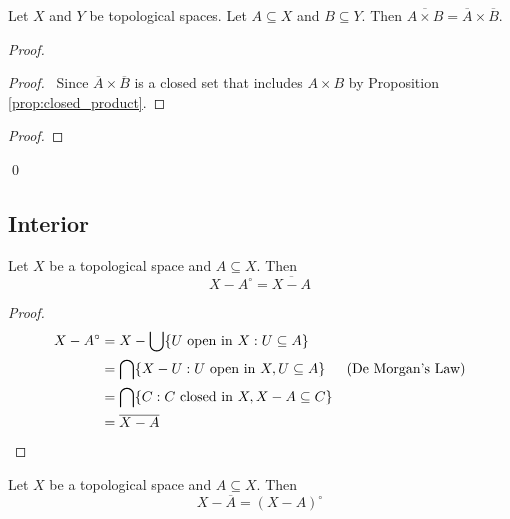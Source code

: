 \begin{prop}
Let $X$ and $Y$ be topological spaces. Let $A \subseteq X$ and $B \subseteq Y$. Then $\overline{A \times B} = \overline{A} \times \overline{B}$.
\end{prop}

\begin{proof}
\pf
{}
\begin{proof}
	\pf\ Since $\overline{A} \times \overline{B}$ is a closed set that includes $A \times B$ by Proposition \ref{prop:closed_product}.
\end{proof}
\begin{proof}
\end{proof}
\qed
\end{proof}

\subsection{Interior}

\begin{prop}
Let $X$ be a topological space and $A \subseteq X$. Then
\[ X - A^\circ = \overline{X - A} \]
\end{prop}

\begin{proof}
\pf
\begin{align*}
X - A^\circ & = X - \bigcup \{ U \text{ open in } X : U \subseteq A \} \\
& = \bigcap \{ X - U : U \text{ open in } X, U \subseteq A \} & (\text{De Morgan's Law}) \\
& = \bigcap \{ C : C \text{ closed in } X, X - A \subseteq C \} \\
& = \overline{X-A} & \qed
\end{align*}
\end{proof}

\begin{prop}
Let $X$ be a topological space and $A \subseteq X$. Then
\[ X - \overline{A} = (X - A)^\circ \]
\end{prop}


